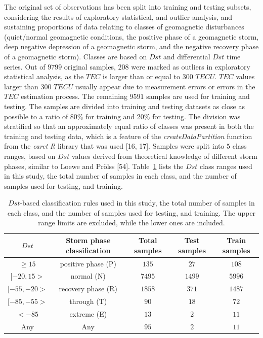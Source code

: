 \let\LaTeXcline\cline\documentclass[sn-mathphys-num]{sn-jnl}\let\cline\LaTeXcline
\begin{document}
The original set of observations has been split into training and testing subsets, considering the results of exploratory statistical, and outlier analysis, and sustaining proportions of data relating to classes of geomagnetic disturbances (quiet/normal geomagnetic conditions, the positive phase of a geomagnetic storm, deep negative depression of a geomagnetic storm, and the negative recovery phase of a geomagnetic storm). Classes are based on $Dst$ and differential $Dst$ time series. Out of $9799$ original samples, $208$ were marked as outliers in exploratory statistical analysis, as the $TEC$ is larger than or equal to $300$ $TECU$. $TEC$ values larger than $300$ $TECU$ usually appear due to measurement errors or errors in the $TEC$ estimation process. The remaining $9591$ samples are used for training and testing. The samples are divided into training and testing datasets as close as possible to a ratio of $80\%$ for training and $20\%$ for testing. The division was stratified so that an approximately equal ratio of classes was present in both the training and testing data, which is a feature of the \textit{createDataPartition} function from the \textit{caret} \textit{R} library that was used [16, 17]. Samples were split into $5$ class ranges, based on $Dst$ values derived from theoretical knowledge of different storm phases, similar to Loewe and Prölss [54]. Table~\ref{tab:Dstranges} lists the $Dst$ class ranges used in this study, the total number of samples in each class, and the number of samples used for testing, and training.

\begin{table}[!ht]
    \centering
    \caption{$Dst$-based classification rules used in this study, the total number of samples in each class, and the number of samples used for testing, and training. The upper range limits are excluded, while the lower ones are included.}
    \label{tab:Dstranges}
    \begin{tabular}{|c|c|c|c|c|}
        \hline
        $Dst$ & Storm phase classification & Total samples & Test samples & Train samples \\ \hline
        $ \geq 15 $ & positive phase (P) & $135$ & $27$ & $108$ \\ \hline
        $[-20, 15>$ & normal (N) & $7495$ & $1499$ & $5996$ \\ \hline
        $[-55, -20>$ & recovery phase (R) & $1858$ & $371$ & $1487$ \\ \hline
        $[-85, -55>$ & through (T) & $90$ & $18$ & $72$ \\ \hline
        $ < -85$ & extreme (E) & $13$ & $2$ & $11$ \\ \hline
        Any & Any & $95$ & $2$ & $11$ \\ \hline
    \end{tabular}
\end{table}
\end{document}
